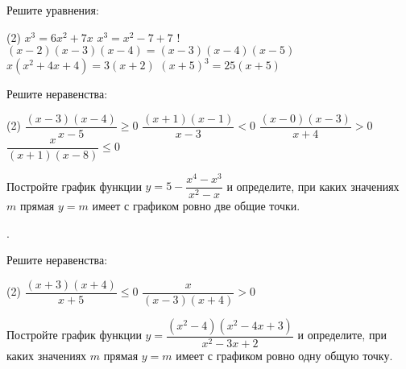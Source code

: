 %

\begin{class}[number=1]
	\begin{listofex}
		\item Решите уравнения: 
			\begin{tasks}(2)
			\task \( x^3=6x^2+7x \)
			\task \( x^3=x^2-7+7 \)
			\task! \( (x-2)(x-3)(x-4)=(x-3)(x-4)(x-5) \)
			\task \( x(x^{2}+4x+4)=3(x+2) \)
			\task \( (x+5)^{3}=25(x+5)\)
		\end{tasks} 
		\item Решите неравенства:
		\begin{tasks}(2)
			\task \( \dfrac{(x-3)(x-4)}{x-5}\ge0 \)
			\task \( \dfrac{(x+1)(x-1)}{x-3}<0 \)
			\task \( \dfrac{(x-0)(x-3)}{x+4}>0 \)
			\task \( \dfrac{x}{(x+1)(x-8)}\le0 \)
		\end{tasks}
		\item Постройте график функции \( y=5-\dfrac{x^4-x^3}{x^2-x} \) и определите, при каких значениях \( m \) прямая \( y=m \) имеет с графиком ровно две общие точки.
	\end{listofex}
\end{class}

\begin{class}[number=2]
	\begin{listofex}
		\item .
	\end{listofex}
\end{class}

\begin{homework}[number=1]
	\begin{listofex}
		\item Решите неравенства:
		\begin{tasks}(2)
			\task \( \dfrac{(x+3)(x+4)}{x+5}\le0 \)
			\task \( \dfrac{x}{(x-3)(x+4)}>0 \)
			\end{tasks}
		\item Постройте график функции \( y=\dfrac{(x^2-4)(x^2-4x+3)}{x^2-3x+2} \) и определите, при каких значениях \( m \) прямая \( y=m \) имеет с графиком ровно одну общую точку.
	\end{listofex}
\end{homework}

